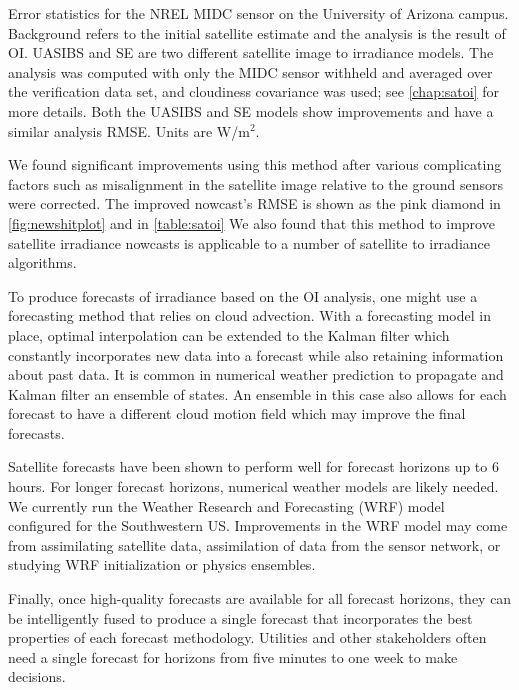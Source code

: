 \begin{table}[htbp]
  \caption[Optimal interpolation error metrics]{ Error statistics for
the NREL MIDC sensor on the University of Arizona campus. Background
refers to the initial satellite estimate and the analysis is the
result of OI. UASIBS and SE are two different satellite image to
irradiance models. The analysis was computed with only the MIDC sensor
withheld and averaged over the verification data set, and cloudiness
covariance was used; see \cref{chap:satoi} for more details. Both the
UASIBS and SE models show improvements and have a similar analysis
RMSE\@. Units are W/m$^2$.}
\label{table:satoi}
\vspace{0.5em}

\centering
\end{table}


We found significant improvements using this method after various
complicating factors such as misalignment in the satellite image
relative to the ground sensors were corrected.
The improved nowcast's RMSE is shown as the pink diamond in
\cref{fig:newshitplot} and in \cref{table:satoi}
We also found that this method to improve satellite irradiance
nowcasts is applicable to a number of satellite to irradiance
algorithms.

To produce forecasts of irradiance based on the OI analysis, one might
use a forecasting method that relies on cloud advection.
With a forecasting model in place, optimal interpolation can be
extended to the Kalman filter which constantly incorporates new data
into a forecast while also retaining information about past data.
It is common in numerical weather prediction to propagate and Kalman
filter  an ensemble of states.
An ensemble in this case also allows for each forecast to have a
different cloud motion field which may improve the final forecasts.

Satellite forecasts have been shown to perform well for forecast
horizons up to 6 hours.
For longer forecast horizons, numerical weather models are likely
needed.
We currently run the Weather Research and Forecasting (WRF) model
configured for the Southwestern US.
Improvements in the WRF model may come from assimilating satellite
data, assimilation of data from the sensor network, or studying WRF
initialization or physics ensembles.

Finally, once high-quality forecasts are available for all forecast
horizons, they can be intelligently fused to produce a single forecast
that incorporates the best properties of each forecast methodology.
Utilities and other stakeholders often need a single forecast for
horizons from five minutes to one week to make decisions.


